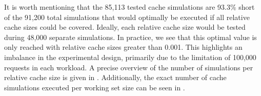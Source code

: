 It is worth mentioning that the 85,113 tested cache simulations are 93.3\% short of the 91,200 total simulations that would optimally be executed if all relative cache sizes could be covered. Ideally, each relative cache size would be tested during 48,000 separate simulations. In practice, we see that this optimal value is only reached with relative cache sizes greater than 0.001. This highlights an imbalance in the experimental design, primarily due to the limitation of 100,000 requests in each workload. A precise overview of the number of simulations per relative cache size is given in . Additionally, the exact number of cache simulations executed per working set size can be seen in .


